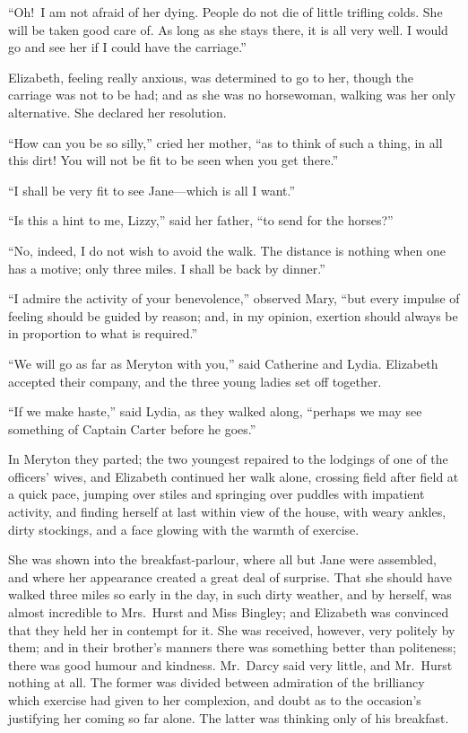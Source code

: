 \documentclass[12pt,english]{book}
\begin{document}
{}``Oh!\ I am not afraid of her dying. People do not die of little
trifling colds. She will be taken good care of. As long as she stays
there, it is all very well. I would go and see her if I could have
the carriage.''

Elizabeth, feeling really anxious, was determined to go to her, though
the carriage was not to be had; and as she was no horsewoman, walking
was her only alternative. She declared her resolution.

{}``How can you be so silly,'' cried her mother, {}``as to think
of such a thing, in all this dirt! You will not be fit to be seen
when you get there.''

{}``I shall be very fit to see Jane\mbox{---}which is all I want.''

{}``Is this a hint to me, Lizzy,'' said her father, {}``to send
for the horses?''\ 

{}``No, indeed, I do not wish to avoid the walk. The distance is
nothing when one has a motive; only three miles. I shall be back by
dinner.''

{}``I admire the activity of your benevolence,'' observed Mary,
{}``but every impulse of feeling should be guided by reason; and,
in my opinion, exertion should always be in proportion to what is
required.''

{}``We will go as far as Meryton with you,'' said Catherine and
Lydia. Elizabeth accepted their company, and the three young ladies
set off together.

{}``If we make haste,'' said Lydia, as they walked along, {}``perhaps
we may see something of Captain Carter before he goes.''

In Meryton they parted; the two youngest repaired to the lodgings
of one of the officers' wives, and Elizabeth continued her walk alone,
crossing field after field at a quick pace, jumping over stiles and
springing over puddles with impatient activity, and finding herself
at last within view of the house, with weary ankles, dirty stockings,
and a face glowing with the warmth of exercise.

She was shown into the breakfast-parlour, where all but Jane were
assembled, and where her appearance created a great deal of surprise.
That she should have walked three miles so early in the day, in such
dirty weather, and by herself, was almost incredible to Mrs.\ Hurst
and Miss Bingley; and Elizabeth was convinced that they held her in
contempt for it. She was received, however, very politely by them;
and in their brother's manners there was something better than politeness;
there was good humour and kindness. Mr.\ Darcy said very little,
and Mr.\ Hurst nothing at all. The former was divided between admiration
of the brilliancy which exercise had given to her complexion, and
doubt as to the occasion's justifying her coming so far alone. The
latter was thinking only of his breakfast.
\end{document}
